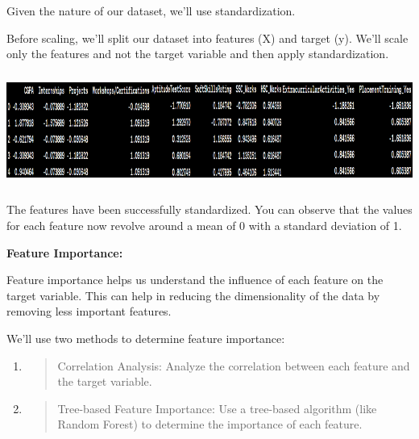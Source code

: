 \documentclass[]{article}
\begin{document}
Given the nature of our dataset, we'll use standardization.

Before scaling, we'll split our dataset into features (X) and target
(y). We'll scale only the features and not the target variable and then
apply standardization.

\includegraphics[width=5.26806in,height=1.46875in]{image6.png}

The features have been successfully standardized. You can observe that
the values for each feature now revolve around a mean of 0 with a
standard deviation of 1.

\textbf{Feature Importance:}

Feature importance helps us understand the influence of each feature on
the target variable. This can help in reducing the dimensionality of the
data by removing less important features.

We'll use two methods to determine feature importance:

\begin{enumerate}
\def\labelenumi{\arabic{enumi}.}
\item
  \begin{quote}
  Correlation Analysis: Analyze the correlation between each feature and
  the target variable.
  \end{quote}
\item
  \begin{quote}
  Tree-based Feature Importance: Use a tree-based algorithm (like Random
  Forest) to determine the importance of each feature.
  \end{quote}
\end{enumerate}
\end{document}
